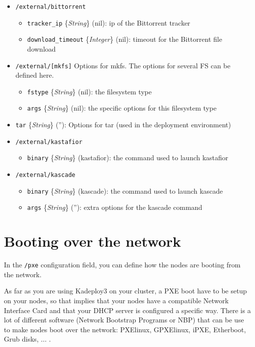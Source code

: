 \documentclass[a4wide,10pt,oneside]{book}
\newcommand{\ypath}[1]{\texttt{#1}}
\newcommand{\yfieldd}[3]{\texttt{#1} {\small\{{\emph{#2}}\}} {\small(}#3{\small)}:}
\begin{document}
\begin{itemize}
  \item \ypath{/external/bittorrent}
  \begin{itemize}
    \item \yfieldd{tracker\_ip}{String}{nil} ip of the Bittorrent tracker
    \item \yfieldd{download\_timeout}{Integer}{nil} timeout for the Bittorrent file download
  \end{itemize}

  \item \ypath{/external/[mkfs]} Options for mkfs. The options for several FS can be defined here.
  \begin{itemize}
    \item \yfieldd{fstype}{String}{nil} the filesystem type
    \item \yfieldd{args}{String}{nil} the specific options for this filesystem type
  \end{itemize}

  \item \yfieldd{tar}{String}{''} Options for tar (used in the deployment environment)

  \item \ypath{/external/kastafior}
  \begin{itemize}
    \item \yfieldd{binary}{String}{kastafior} the command used to launch kastafior
  \end{itemize}

  \item \ypath{/external/kascade}
  \begin{itemize}
    \item \yfieldd{binary}{String}{kascade} the command used to launch kascade
    \item \yfieldd{args}{String}{''} extra options for the kascade command
  \end{itemize}
\end{itemize}

\section{Booting over the network}\label{sec:netboot}
In the \ypath{/pxe} configuration field, you can define how the nodes are booting from the network.

As far as you are using Kadeploy3 on your cluster, a PXE boot have to be setup on your nodes, so that implies that your nodes have a compatible Network Interface Card and that your DHCP server is configured a specific way. There is a lot of different software (Network Bootstrap Programs or NBP) that can be use to make  nodes boot over the network: PXElinux, GPXElinux, iPXE, Etherboot, Grub disks, ... .
\end{document}
